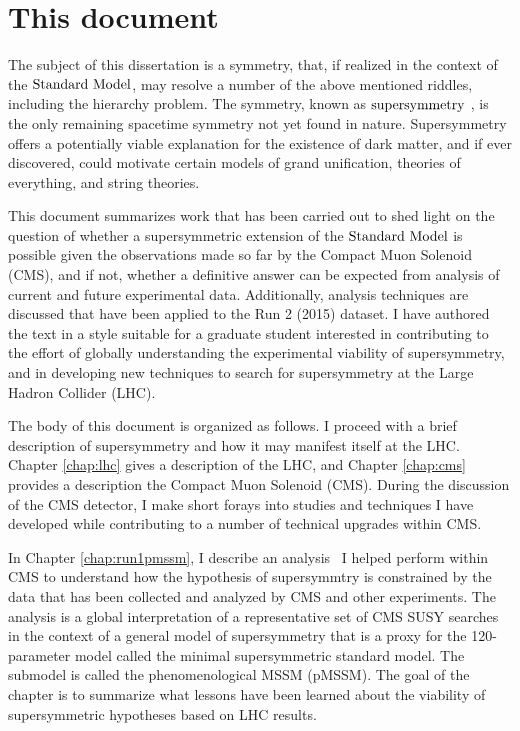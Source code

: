 \section{This document}

The subject of this dissertation is a symmetry, that, if realized in the context of the $\text{Standard\ Model}$, may resolve a number of the above mentioned riddles, including the hierarchy problem. The symmetry, known as $\text{supersymmetry}$ \cite{Martin:1997ns}, is the only remaining spacetime symmetry not yet found in nature. Supersymmetry offers a potentially viable explanation for the existence of dark matter, and if ever discovered, could motivate certain models of grand unification, theories of everything, and string theories. 

This document summarizes work that has been carried out to shed light on the question of whether a supersymmetric extension of the $\text{Standard\ Model}$ is possible given the observations made so far by the Compact Muon Solenoid (CMS), and if not, whether a definitive answer can be expected from analysis of current and future experimental data. Additionally, analysis techniques are discussed that have been applied to the Run 2 (2015) dataset. I have authored the text in a style suitable for a graduate student interested in contributing to the effort of globally understanding the experimental viability of supersymmetry, and in developing new techniques to search for  supersymmetry at the Large Hadron Collider (LHC).

The body of this document is organized as follows. I proceed with a brief description of supersymmetry and how it may manifest itself at the LHC.  Chapter \ref{chap:lhc} gives a description of the LHC, and Chapter \ref{chap:cms} provides a description the Compact Muon Solenoid (CMS). During the discussion of the CMS detector, I make short forays into studies and techniques I have developed while contributing to a number of technical upgrades within CMS. 

In Chapter \ref{chap:run1pmssm}, I describe an analysis~\cite{bib:Me!} I helped perform within CMS to understand how the hypothesis of supersymmtry is constrained by the data that has been collected and analyzed by CMS and other experiments. The analysis is a global interpretation of a representative set of CMS SUSY searches in the context of a general model of supersymmetry that is a proxy for the 120-parameter model called the minimal supersymmetric standard model. The submodel is called the phenomenological MSSM (pMSSM). The goal of the chapter is to summarize what lessons have been learned about the viability of supersymmetric hypotheses based on LHC results. 

